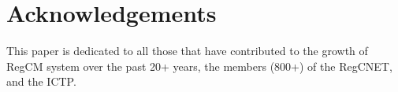 
\section*{Acknowledgements}

This paper is dedicated to all those that have contributed to the growth
of RegCM system over the past 20+ years, the members (800+) of the
RegCNET, and the ICTP.

